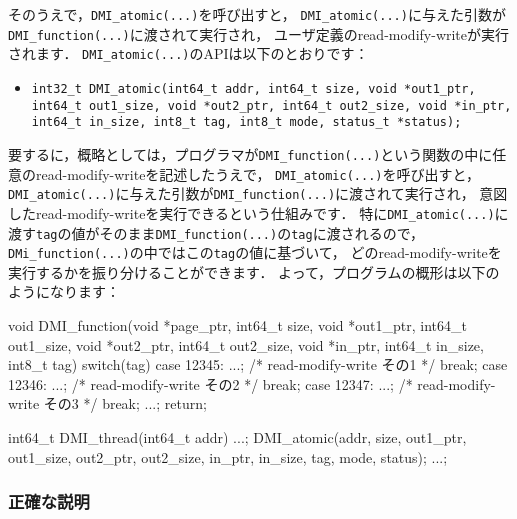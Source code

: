 \documentclass[report,12pt]{jsbook}
\begin{document}
そのうえで，\texttt{DMI\_atomic(...)}を呼び出すと，
\texttt{DMI\_atomic(...)}に与えた引数が\texttt{DMI\_function(...)}に渡されて実行され，
ユーザ定義のread-modify-writeが実行されます．
\texttt{DMI\_atomic(...)}のAPIは以下のとおりです：
\begin{itemize}
\item \texttt{int32\_t DMI\_atomic(int64\_t addr, int64\_t size, void *out1\_ptr, int64\_t out1\_size, void *out2\_ptr, int64\_t out2\_size, void *in\_ptr, int64\_t in\_size, int8\_t tag, int8\_t mode, status\_t *status);}
\end{itemize}

要するに，概略としては，プログラマが\texttt{DMI\_function(...)}という関数の中に任意のread-modify-writeを記述したうえで，
\texttt{DMI\_atomic(...)}を呼び出すと，
\texttt{DMI\_atomic(...)}に与えた引数が\texttt{DMI\_function(...)}に渡されて実行され，
意図したread-modify-writeを実行できるという仕組みです．
特に\texttt{DMI\_atomic(...)}に渡す\texttt{tag}の値がそのまま\texttt{DMI\_function(...)}の\texttt{tag}に渡されるので，
\texttt{DMi\_function(...)}の中ではこの\texttt{tag}の値に基づいて，
どのread-modify-writeを実行するかを振り分けることができます．
よって，プログラムの概形は以下のようになります：
\begin{code}
void DMI_function(void *page_ptr, int64_t size, void *out1_ptr, int64_t out1_size, void *out2_ptr, int64_t out2_size, void *in_ptr, int64_t in_size, int8_t tag)
{
  switch(tag)
    {
    case 12345:
      ...; /* read-modify-write その1 */
      break;
    case 12346:
      ...; /* read-modify-write その2 */
      break;
    case 12347:
      ...; /* read-modify-write その3 */
      break;
    ...;
    }
  return;
}

int64_t DMI_thread(int64_t addr)
{
  ...;
  DMI_atomic(addr, size, out1_ptr, out1_size, out2_ptr, out2_size, in_ptr, in_size, tag, mode, status);
  ...;
}
\end{code}

\subsubsection{正確な説明}
\end{document}
